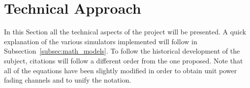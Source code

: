 \section{Technical Approach}	%
\label{sec:technical_approach}

In this Section all the technical aspects of the project will be presented. A quick explanation of the various simulators implemented will follow in Subsection~\ref{subsec:math_models}. To follow the historical development of the subject, citations will follow a different order from the one proposed. Note that all of the equations have been slightly modified in order to obtain unit power fading channels and to unify the notation.





